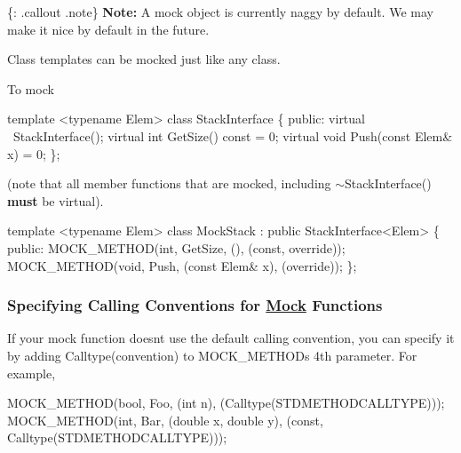 \{\+: .callout .note\} {\bfseries Note\+:} A mock object is currently naggy by default. We may make it nice by default in the future.

Class templates can be mocked just like any class.

To mock


\begin{DoxyCode}
\textcolor{keyword}{template} <\textcolor{keyword}{typename} Elem>
\textcolor{keyword}{class }StackInterface \{
 \textcolor{keyword}{public}:
  \textcolor{keyword}{virtual} ~StackInterface();
  \textcolor{keyword}{virtual} \textcolor{keywordtype}{int} GetSize() \textcolor{keyword}{const} = 0;
  \textcolor{keyword}{virtual} \textcolor{keywordtype}{void} Push(\textcolor{keyword}{const} Elem& x) = 0;
\};
\end{DoxyCode}


(note that all member functions that are mocked, including {\ttfamily $\sim$\+Stack\+Interface()} {\bfseries must} be virtual).


\begin{DoxyCode}
\textcolor{keyword}{template} <\textcolor{keyword}{typename} Elem>
\textcolor{keyword}{class }MockStack : \textcolor{keyword}{public} StackInterface<Elem> \{
 \textcolor{keyword}{public}:
  MOCK\_METHOD(\textcolor{keywordtype}{int}, GetSize, (), (\textcolor{keyword}{const}, \textcolor{keyword}{override}));
  MOCK\_METHOD(\textcolor{keywordtype}{void}, Push, (\textcolor{keyword}{const} Elem& x), (\textcolor{keyword}{override}));
\};
\end{DoxyCode}


\subsubsection*{Specifying Calling Conventions for \mbox{\hyperlink{classMock}{Mock}} Functions}

If your mock function doesn\textquotesingle{}t use the default calling convention, you can specify it by adding {\ttfamily Calltype(convention)} to {\ttfamily M\+O\+C\+K\+\_\+\+M\+E\+T\+H\+OD}\textquotesingle{}s 4th parameter. For example,


\begin{DoxyCode}
MOCK\_METHOD(\textcolor{keywordtype}{bool}, Foo, (\textcolor{keywordtype}{int} n), (Calltype(STDMETHODCALLTYPE)));
MOCK\_METHOD(\textcolor{keywordtype}{int}, Bar, (\textcolor{keywordtype}{double} x, \textcolor{keywordtype}{double} y),
            (\textcolor{keyword}{const}, Calltype(STDMETHODCALLTYPE)));
\end{DoxyCode}


